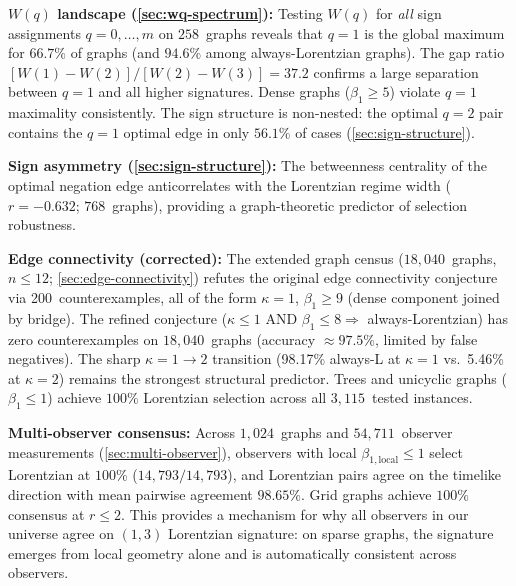\documentclass[11pt]{article}
\theoremstyle{definition}
\theoremstyle{remark}
\begin{document}
\textbf{$W(q)$ landscape (\cref{sec:wq-spectrum}):}
Testing $W(q)$ for \emph{all} sign assignments $q = 0, \ldots, m$ on
$258$~graphs reveals that $q = 1$ is the global maximum for $66.7\%$ of
graphs (and $94.6\%$ among always-Lorentzian graphs). The gap ratio
$[W(1) - W(2)] / [W(2) - W(3)] = 37.2$ confirms a large separation between
$q = 1$ and all higher signatures. Dense graphs ($\beta_1 \geq 5$) violate
$q{=}1$ maximality consistently. The sign structure is non-nested: the
optimal $q{=}2$ pair contains the $q{=}1$ optimal edge in only $56.1\%$ of
cases (\cref{sec:sign-structure}).

\textbf{Sign asymmetry (\cref{sec:sign-structure}):}
The betweenness centrality of the optimal negation edge anticorrelates with
the Lorentzian regime width ($r = -0.632$; $768$~graphs), providing a
graph-theoretic predictor of selection robustness.

\textbf{Edge connectivity (corrected):}
The extended graph census ($18{,}040$~graphs, $n \leq 12$;
\cref{sec:edge-connectivity}) refutes the original edge connectivity conjecture
via 200~counterexamples, all of the form $\kappa = 1$, $\beta_1 \geq 9$
(dense component joined by bridge). The refined conjecture
($\kappa \leq 1$ AND $\beta_1 \leq 8 \Rightarrow$ always-Lorentzian)
has zero counterexamples on $18{,}040$~graphs (accuracy $\approx 97.5\%$,
limited by false negatives). The sharp $\kappa = 1 \to 2$ transition
(98.17\% always-L at $\kappa = 1$ vs.\ 5.46\% at $\kappa = 2$) remains the
strongest structural predictor. Trees and unicyclic graphs ($\beta_1 \leq 1$)
achieve $100\%$ Lorentzian selection across all $3{,}115$~tested instances.

\textbf{Multi-observer consensus:}
Across $1{,}024$~graphs and $54{,}711$~observer measurements
(\cref{sec:multi-observer}), observers with local $\beta_{1,\mathrm{local}} \leq 1$
select Lorentzian at $100\%$ ($14{,}793/14{,}793$), and Lorentzian pairs
agree on the timelike direction with mean pairwise agreement $98.65\%$.
Grid graphs achieve $100\%$ consensus at $r \leq 2$. This provides a
mechanism for why all observers in our universe agree on $(1,3)$ Lorentzian
signature: on sparse graphs, the signature emerges from local geometry alone
and is automatically consistent across observers.
\end{document}

